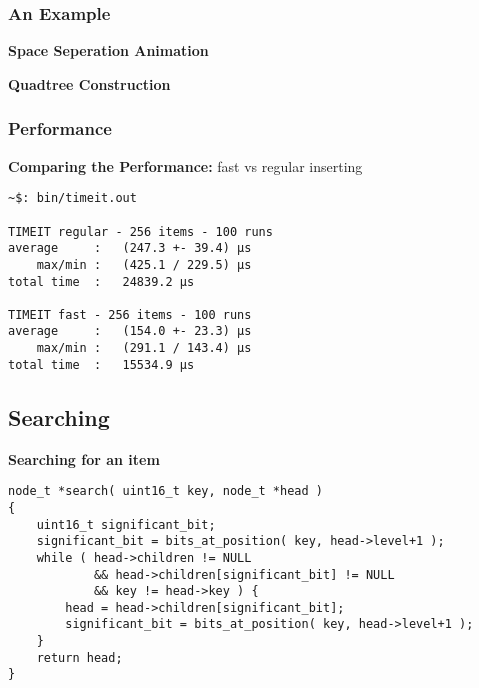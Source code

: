 \subsubsection*{An Example}
\begin{frame}
    \textbf{Space Seperation Animation}
    \begin{center}
    \end{center}
\end{frame}

\begin{frame}
    \textbf{Quadtree Construction}
    \begin{center}
    \end{center}
\end{frame}

\subsubsection*{Performance}
\begin{frame}[fragile]
    \textbf{Comparing the Performance:} fast vs regular inserting \\
    \begin{verbatim}
~$: bin/timeit.out

TIMEIT regular - 256 items - 100 runs
average     :   (247.3 +- 39.4) μs
    max/min :   (425.1 / 229.5) μs
total time  :   24839.2 μs

TIMEIT fast - 256 items - 100 runs
average     :   (154.0 +- 23.3) μs
    max/min :   (291.1 / 143.4) μs
total time  :   15534.9 μs

    \end{verbatim}
\end{frame}


\subsection{Searching}
\begin{frame}[fragile]
    \textbf{Searching for an item}
    \begin{verbatim}
node_t *search( uint16_t key, node_t *head )
{
    uint16_t significant_bit;
    significant_bit = bits_at_position( key, head->level+1 );
    while ( head->children != NULL
            && head->children[significant_bit] != NULL
            && key != head->key ) {
        head = head->children[significant_bit];
        significant_bit = bits_at_position( key, head->level+1 );
    }
    return head;
}
    \end{verbatim}
\end{frame}

